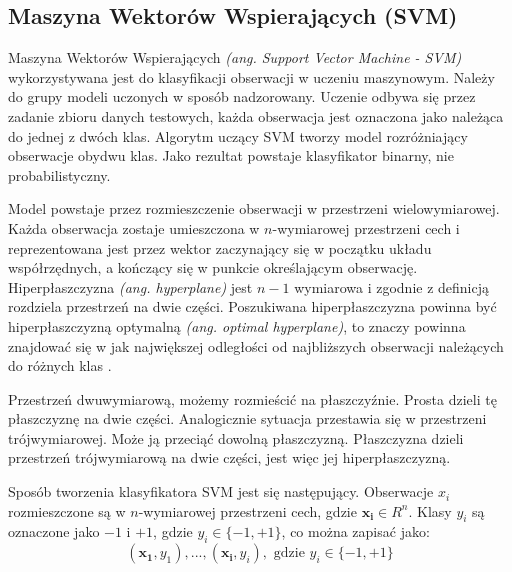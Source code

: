 \documentclass[a4paper,12pt,twoside,openany]{report}
\newcommand{\ang}[1]{\textit{(ang. #1)}}
\renewcommand{\vec}[1]{\bm{#1}}
\begin{document}
\subsection{Maszyna Wektorów Wspierających (SVM)}

Maszyna Wektorów Wspierających \ang{Support Vector Machine - SVM} wykorzystywana jest do klasyfikacji obserwacji w uczeniu maszynowym.
Należy do grupy modeli uczonych w sposób nadzorowany. 
Uczenie odbywa się przez zadanie zbioru danych testowych, 
każda obserwacja jest oznaczona jako należąca do jednej z dwóch klas.
Algorytm uczący SVM tworzy model rozróżniający obserwacje obydwu klas.
Jako rezultat powstaje klasyfikator binarny, nie probabilistyczny. 

Model powstaje przez rozmieszczenie obserwacji w przestrzeni wielowymiarowej.
Każda obserwacja zostaje umieszczona w $n$-wymiarowej przestrzeni cech i reprezentowana jest przez wektor
zaczynający się w początku układu współrzędnych, a kończący się w punkcie określającym obserwację. 
Hiperpłaszczyzna \ang{hyperplane} jest $n-1$ wymiarowa i zgodnie z definicją rozdziela przestrzeń na dwie części.
Poszukiwana hiperpłaszczyzna powinna być hiperpłaszczyzną optymalną \ang{optimal hyperplane}, 
to znaczy powinna znajdować się w jak największej odległości od najbliższych obserwacji należących do różnych klas \cite{Cortes1995}.

Przestrzeń dwuwymiarową, możemy rozmieścić na płaszczyźnie. 
Prosta dzieli tę płaszczyznę na dwie części.
Analogicznie sytuacja przestawia się w przestrzeni trójwymiarowej.
Może ją przeciąć dowolną płaszczyzną.
Płaszczyzna dzieli przestrzeń trójwymiarową na dwie części, jest więc jej hiperpłaszczyzną.

Sposób tworzenia klasyfikatora SVM jest się następujący.
Obserwacje $x_i$ rozmieszczone są w $n$-wymiarowej przestrzeni cech, gdzie $\vec{x_i} \in R^n$.
Klasy $y_i$ są oznaczone jako $-1$ i $+1$, gdzie $y_i \in \{-1, +1\}$, co można zapisać jako:
\begin{equation}
	(\bm{x_1},y_1), ..., (\bm{x_i}, y_i), \textrm{ gdzie } y_i \in \{-1, +1\}
\end{equation}
\end{document}
